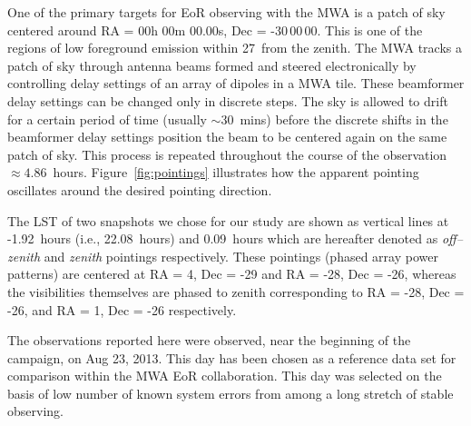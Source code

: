 \documentclass[preprint2,iop,numberedappendix]{emulateapj}
\begin{document}
One of the primary targets for EoR observing with the MWA is a patch of sky centered around RA = 00h 00m 00.00s, Dec = -30\arcdeg$\,$00\arcmin$\,$00. This is one of the regions of low foreground emission within 27\arcdeg$\,$ from the zenith. The MWA tracks a patch of sky through antenna beams formed and steered electronically by controlling delay settings of an array of dipoles in a MWA tile. These beamformer delay settings can be changed only in discrete steps. The sky is allowed to drift for a certain period of time (usually $\sim 30$~mins) before the discrete shifts in the beamformer delay settings position the beam to be centered again on the same patch of sky. This process is repeated throughout the course of the observation $\approx 4.86$~hours. Figure~\ref{fig:pointings} illustrates how the apparent pointing oscillates around the desired pointing direction. 

The LST of two snapshots we chose for our study are shown as vertical lines at -1.92~hours (i.e., 22.08~hours) and 0.09~hours which are hereafter denoted as {\it off--zenith} and {\it zenith} pointings respectively. These pointings (phased array power patterns) are centered at RA = 4, Dec = -29 and RA = -28, Dec = -26, whereas the visibilities themselves are phased to zenith corresponding to RA = -28, Dec = -26, and RA = 1, Dec = -26 respectively.   

The observations reported here were observed, near the beginning of the campaign, on Aug 23, 2013. This day has been chosen as a reference data set for comparison within the MWA EoR collaboration. This day was selected on the basis of low number of known system errors from among a long stretch of stable observing.
\end{document}
